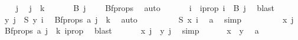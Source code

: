 \begin{isabellebody}
\ \ \isamarkupfalse%
\ j\ \isamarkupfalse%
\ {\isachardoublequoteopen}j\ {\isacharless}{\kern0pt}\ k{\isachardoublequoteclose}\isanewline
\ \ \ \isamarkupfalse%
\ \isamarkupfalse%
\ {\isachardoublequoteopen}B\ j\ {\isasymnoteq}\ {\isacharbraceleft}{\kern0pt}{\isacharbraceright}{\kern0pt}{\isachardoublequoteclose}\ \isamarkupfalse%
\ Bf{\isacharunderscore}{\kern0pt}props\ \isamarkupfalse%
\ auto\isanewline
\ \ \ \isamarkupfalse%
\ \isamarkupfalse%
\ i\ \ i{\isacharunderscore}{\kern0pt}prop{\isacharcolon}{\kern0pt}\ {\isachardoublequoteopen}i\ {\isasymin}\ B\ j{\isachardoublequoteclose}\ \isamarkupfalse%
\ blast\isanewline
\ \ \ \isamarkupfalse%
\ \isamarkupfalse%
\ {\isachardoublequoteopen}y\ j\ {\isacharequal}{\kern0pt}\ S\ y\ i{\isachardoublequoteclose}\ \isamarkupfalse%
\ Bf{\isacharunderscore}{\kern0pt}props\ a{\isacharparenleft}{\kern0pt}{}{\isacharparenright}{\kern0pt}\ {\isacartoucheopen}j\ {\isacharless}{\kern0pt}\ k{\isacartoucheclose}\ \isamarkupfalse%
\ auto\isanewline
\ \ \ \isamarkupfalse%
\ \isamarkupfalse%
\ {\isachardoublequoteopen}\ {\isachardot}{\kern0pt}{\isachardot}{\kern0pt}{\isachardot}{\kern0pt}\ {\isacharequal}{\kern0pt}\ S\ x\ i{\isachardoublequoteclose}\ \isamarkupfalse%
\ a\ \isamarkupfalse%
\ simp\isanewline
\ \ \ \isamarkupfalse%
\ \isamarkupfalse%
\ {\isachardoublequoteopen}\ {\isachardot}{\kern0pt}{\isachardot}{\kern0pt}{\isachardot}{\kern0pt}\ {\isacharequal}{\kern0pt}\ x\ j{\isachardoublequoteclose}\ \isamarkupfalse%
\ Bf{\isacharunderscore}{\kern0pt}props\ a{\isacharparenleft}{\kern0pt}{}{\isacharparenright}{\kern0pt}\ {\isacartoucheopen}j\ {\isacharless}{\kern0pt}\ k{\isacartoucheclose}\ i{\isacharunderscore}{\kern0pt}prop\ \isamarkupfalse%
\ blast\isanewline
\ \ \ \isamarkupfalse%
\ \isamarkupfalse%
\ {\isachardoublequoteopen}x\ j\ {\isacharequal}{\kern0pt}\ y\ j{\isachardoublequoteclose}\ \isamarkupfalse%
\ simp\isanewline
\ \isamarkupfalse%
\isanewline
\ \isamarkupfalse%
\ \isamarkupfalse%
\ {\isachardoublequoteopen}x\ {\isacharequal}{\kern0pt}\ y{\isachardoublequoteclose}\ \isamarkupfalse%
\ a{\isacharparenleft}{\kern0pt}{}{\isacharcomma}{\kern0pt}{}{\isacharparenright}{\kern0pt}\ \isamarkupfalse%

\end{isabellebody}
